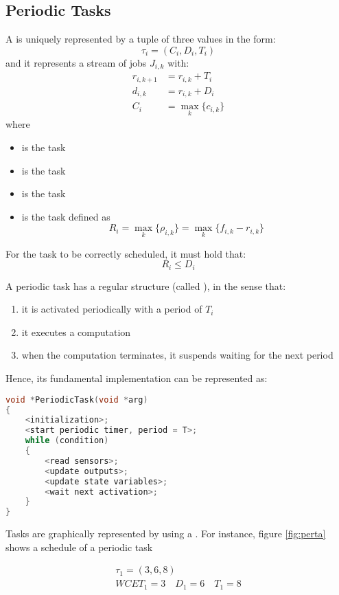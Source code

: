 \subsection{Periodic Tasks}
A  is uniquely represented by a tuple of three values in the form:
\[\tau_i = (C_i, D_i, T_i)\]
and it represents a stream of jobs $J_{i,k}$ with:
\begin{align*}
r_{i,k+1} &= r_{i,k} + T_i\\
d_{i,k} &= r_{i,k}  + D_i\\
C_i &= \max_{k}\{c_{i,k}\}
\end{align*}
where
\begin{itemize}
\item{ is the task }
\item{ is the task }
\item{ is the task }
\item{ is the task } defined as
\[R_i = \max_k\{\rho_{i,k}\} = \max_k\{f_{i,k} - r_{i,k}\}\]
\end{itemize}
For the task to be correctly scheduled, it must hold that:
\[R_i \le D_i\]

A periodic task has a regular structure (called ), in the sense that:
\begin{enumerate}
\item it is activated periodically with a period of $T_i$
\item it executes a computation
\item when the computation terminates, it suspends waiting for the next period
\end{enumerate}

Hence, its fundamental implementation can be represented as:

\begin{lstlisting}[language=C++]
void *PeriodicTask(void *arg)
{
	<initialization>;
	<start periodic timer, period = T>;
	while (condition)
	{
		<read sensors>;
		<update outputs>;
		<update state variables>;
		<wait next activation>;
	}
}
\end{lstlisting}

Tasks are graphically represented by using a . For instance, figure \ref{fig:perta} shows a schedule of a periodic task 

\begin{gather*}
\tau_1 = (3,6,8)\\
WCET_1 = 3\quad D_1 = 6\quad T_1 = 8
\end{gather*}

